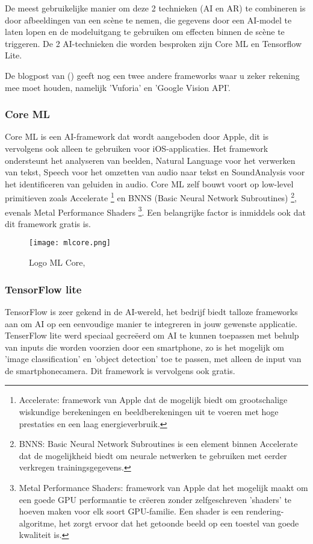 De meest gebruikelijke manier om deze 2 technieken (AI en AR) te combineren is door afbeeldingen van een scène te nemen, die gegevens door een AI-model te laten lopen en de modeluitgang te gebruiken om effecten binnen de scène te triggeren. De 2 AI-technieken die worden besproken zijn Core ML en Tensorflow Lite.

De blogpost van \autocite{Girish2020} () geeft nog een twee andere frameworks waar u zeker rekening mee moet houden, namelijk 'Vuforia' en 'Google Vision API'.

\subsubsection{Core ML}
Core ML is een AI-framework dat wordt aangeboden door Apple, dit is vervolgens ook alleen te gebruiken voor iOS-applicaties. Het framework ondersteunt het analyseren van beelden, Natural Language voor het verwerken van tekst, Speech voor het omzetten van audio naar tekst en SoundAnalysis voor het identificeren van geluiden in audio. Core ML zelf bouwt voort op low-level primitieven zoals Accelerate \footnote{Accelerate: framework van Apple dat de mogelijk biedt om grootschalige wiskundige berekeningen en beeldberekeningen uit te voeren met hoge prestaties en een laag energieverbruik.} en BNNS (Basic Neural Network Subroutines) \footnote{BNNS: Basic Neural Network Subroutines is een element binnen Accelerate dat de mogelijkheid biedt om neurale netwerken te gebruiken met eerder verkregen trainingsgegevens.}, evenals Metal Performance Shaders \footnote{Metal Performance Shaders: framework van Apple dat het mogelijk maakt om een goede GPU performantie te crëeren zonder zelfgeschreven 'shaders' te hoeven maken voor elk soort GPU-familie. Een shader is een rendering-algoritme, het zorgt ervoor dat het getoonde beeld op een toestel van goede kwaliteit is.}. Een belangrijke factor is inmiddels ook dat dit framework gratis is. \autocite{AppleML2020}


\begin{figure}[H]
	\centering
	\texttt{[image: mlcore.png]}
	\caption{Logo ML Core, \autocite{AppleML2020}}
\end{figure}

\subsubsection{TensorFlow lite}
TensorFlow is zeer gekend in de AI-wereld, het bedrijf biedt talloze frameworks aan om AI op een eenvoudige manier te integreren in jouw gewenste applicatie. TenserFlow lite werd speciaal gecreëerd om AI te kunnen toepassen met behulp van inputs die worden voorzien door een smartphone, zo is het mogelijk om 'image classification' en 'object detection' toe te passen, met alleen de input van de smartphonecamera. Dit framework is vervolgens ook gratis. \autocite{TensorFlowLite2020}

